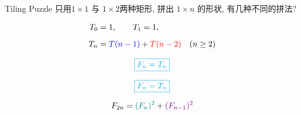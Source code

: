 \begin{frame}{}
  \begin{exampleblock}{Tiling Puzzle}
    只用$1 \times 1$ 与 $1 \times 2$两种矩形,
    拼出 $1 \times n$ 的形状, 有几种不同的拼法?
  \end{exampleblock}

  \pause
  \vspace{0.30cm}

  \pause

  \pause
  \vspace{-0.30cm}
  \begin{align*}
    T_{0} &= 1, \qquad T_{1} = 1, \\[6pt]
    T_{n} &= \textcolor{blue}{T(n-1)} + \textcolor{red}{T(n-2)} \quad (n \ge 2)
  \end{align*}

  \pause
  \[
    \textcolor{cyan}{\boxed{F_{n} = T_{n}}}
  \]
\end{frame}

\begin{frame}{}
  \[
    \textcolor{cyan}{\boxed{F_{n} = T_{n}}}
  \]

  \pause
  \vspace{0.50cm}
  \[
    F_{2n} = \textcolor{teal}{(F_{n})^{2}} + \textcolor{violet}{(F_{n-1})^{2}}
  \]

  \pause
  \vspace{0.50cm}
\end{frame}

